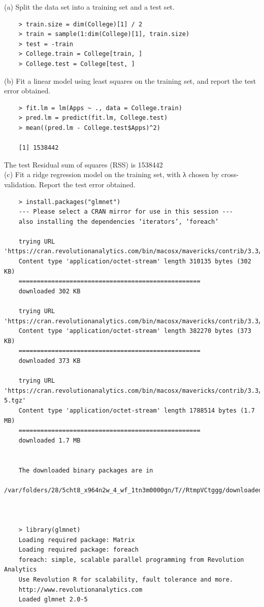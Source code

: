 \documentclass{article}
\begin{document}
(a) Split the data set into a training set and a test set.\\

\begin{program}
	\begin{verbatim}
	> train.size = dim(College)[1] / 2
	> train = sample(1:dim(College)[1], train.size) 
	> test = -train
	> College.train = College[train, ]
	> College.test = College[test, ]	
	\end{verbatim}
\end{program}

(b) Fit a linear model using least squares on the training set, and report the test error obtained.\\

\begin{program}
	\begin{verbatim}
	> fit.lm = lm(Apps ~ ., data = College.train)
	> pred.lm = predict(fit.lm, College.test)
	> mean((pred.lm - College.test$Apps)^2)
	
	[1] 1538442
	\end{verbatim}
\end{program}
The test Residual sum of squares (RSS)  is 1538442\\



(c) Fit a ridge regression model on the training set, with λ chosen by cross-validation. Report the test error obtained.\\

\begin{program}
	\begin{verbatim}
	> install.packages("glmnet")
	--- Please select a CRAN mirror for use in this session ---
	also installing the dependencies ‘iterators’, ‘foreach’
	
	trying URL 'https://cran.revolutionanalytics.com/bin/macosx/mavericks/contrib/3.3/iterators_1.0.8.tgz'
	Content type 'application/octet-stream' length 310135 bytes (302 KB)
	==================================================
	downloaded 302 KB
	
	trying URL 'https://cran.revolutionanalytics.com/bin/macosx/mavericks/contrib/3.3/foreach_1.4.3.tgz'
	Content type 'application/octet-stream' length 382270 bytes (373 KB)
	==================================================
	downloaded 373 KB
	
	trying URL 'https://cran.revolutionanalytics.com/bin/macosx/mavericks/contrib/3.3/glmnet_2.0-5.tgz'
	Content type 'application/octet-stream' length 1788514 bytes (1.7 MB)
	==================================================
	downloaded 1.7 MB
	
	
	The downloaded binary packages are in
	/var/folders/28/5cht8_x964n2w_4_wf_1tn3m0000gn/T//RtmpVCtggg/downloaded_packages
	
	
	
	> library(glmnet)
	Loading required package: Matrix
	Loading required package: foreach
	foreach: simple, scalable parallel programming from Revolution Analytics
	Use Revolution R for scalability, fault tolerance and more.
	http://www.revolutionanalytics.com
	Loaded glmnet 2.0-5
		
	\end{verbatim}
\end{program}
\end{document}
